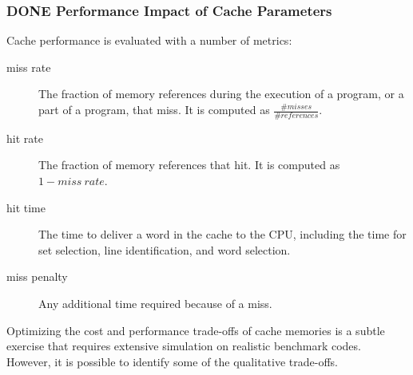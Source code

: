 \documentclass[11pt]{article}
\begin{document}
\subsubsection{{\bfseries\sffamily DONE} Performance Impact of Cache Parameters}
\label{sec:org53c112d}
Cache performance is evaluated with a number of metrics:\\
\begin{description}
\item[{miss rate}] The fraction of memory references during the execution of a program, or a part of a program, that miss. It is computed as \(\frac{\#misses}{\#references}\).\\
\item[{hit rate}] The fraction of memory references that hit. It is computed as \(1 − miss\ rate\).\\
\item[{hit time}] The time to deliver a word in the cache to the CPU, including the time for set selection, line identification, and word selection.\\
\item[{miss penalty}] Any additional time required because of a miss.\\
\end{description}

Optimizing the cost and performance trade-offs of cache memories is a subtle exercise that requires extensive simulation on realistic benchmark codes. However, it is possible to identify some of the qualitative trade-offs.\\
\end{document}

